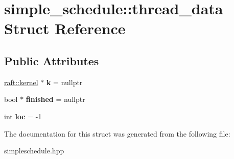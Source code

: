 \hypertarget{structsimple__schedule_1_1thread__data}{}\section{simple\+\_\+schedule\+:\+:thread\+\_\+data Struct Reference}
\label{structsimple__schedule_1_1thread__data}
\subsection*{Public Attributes}
\begin{DoxyCompactItemize}
\item 
\hypertarget{structsimple__schedule_1_1thread__data_a305aa7c84f8d5ca9e5be14587aab1d4b}{}\hyperlink{classraft_1_1kernel}{raft\+::kernel} $\ast$ {\bfseries k} = nullptr\label{structsimple__schedule_1_1thread__data_a305aa7c84f8d5ca9e5be14587aab1d4b}

\item 
\hypertarget{structsimple__schedule_1_1thread__data_a709b2a546fdec27844576378018b553e}{}bool $\ast$ {\bfseries finished} = nullptr\label{structsimple__schedule_1_1thread__data_a709b2a546fdec27844576378018b553e}

\item 
\hypertarget{structsimple__schedule_1_1thread__data_a5cb622205eb6d4a4044e79c36e99d1c4}{}int {\bfseries loc} = -\/1\label{structsimple__schedule_1_1thread__data_a5cb622205eb6d4a4044e79c36e99d1c4}

\end{DoxyCompactItemize}


The documentation for this struct was generated from the following file\+:\begin{DoxyCompactItemize}
\item 
simpleschedule.\+hpp\end{DoxyCompactItemize}
